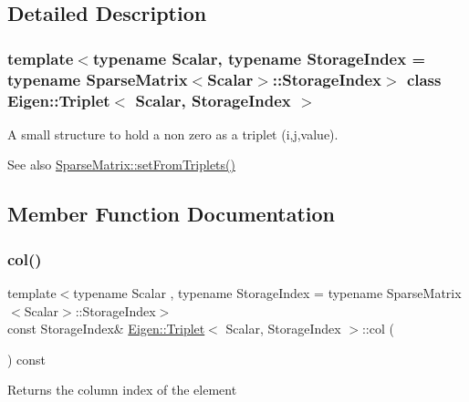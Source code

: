 \subsection{Detailed Description}
\subsubsection*{template$<$typename Scalar, typename Storage\+Index = typename Sparse\+Matrix$<$\+Scalar$>$\+::\+Storage\+Index$>$\newline
class Eigen\+::\+Triplet$<$ Scalar, Storage\+Index $>$}

A small structure to hold a non zero as a triplet (i,j,value). 

\begin{DoxySeeAlso}{See also}
\mbox{\hyperlink{class_eigen_1_1_sparse_matrix_acc35051d698e3973f1de5b9b78dbe345}{Sparse\+Matrix\+::set\+From\+Triplets()}} 
\end{DoxySeeAlso}


\subsection{Member Function Documentation}
\mbox{\label{class_eigen_1_1_triplet_a3531e3e2098507a069a368d72d46471e}} 
\subsubsection{\texorpdfstring{col()}{col()}}
{\footnotesize\ttfamily template$<$typename Scalar , typename Storage\+Index  = typename Sparse\+Matrix$<$\+Scalar$>$\+::\+Storage\+Index$>$ \\
const Storage\+Index\& \mbox{\hyperlink{class_eigen_1_1_triplet}{Eigen\+::\+Triplet}}$<$ Scalar, Storage\+Index $>$\+::col (\begin{DoxyParamCaption}{ }\end{DoxyParamCaption}) const\hspace{0.3cm}{\ttfamily [inline]}}

\begin{DoxyReturn}{Returns}
the column index of the element 
\end{DoxyReturn}
\mbox{\label{class_eigen_1_1_triplet_ae88b0ad6d31daa53e298b9cc4201fdee}} 
